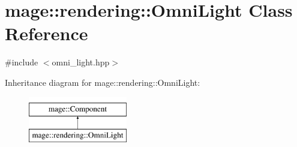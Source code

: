 \hypertarget{classmage_1_1rendering_1_1_omni_light}{}\section{mage\+:\+:rendering\+:\+:Omni\+Light Class Reference}
\label{classmage_1_1rendering_1_1_omni_light}


{\ttfamily \#include $<$omni\+\_\+light.\+hpp$>$}

Inheritance diagram for mage\+:\+:rendering\+:\+:Omni\+Light\+:\begin{figure}[H]
\begin{center}
\leavevmode
\includegraphics[height=2.000000cm]{classmage_1_1rendering_1_1_omni_light}
\end{center}
\end{figure}
